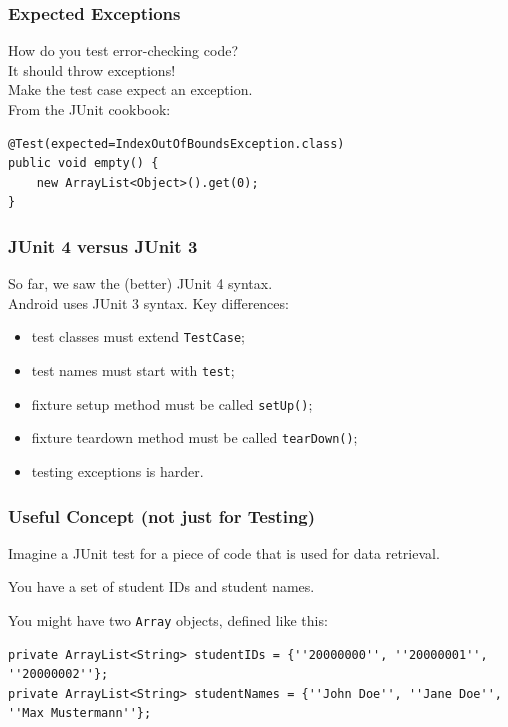 \begin{frame}[fragile]
\frametitle{Expected Exceptions}

\begin{changemargin}{1cm}
How do you test error-checking code?\\[1em]

\pause
It should throw exceptions!\\[1em]

Make the test case expect an exception.\\[1em]
From the JUnit cookbook:
\end{changemargin}

\begin{verbatim}
@Test(expected=IndexOutOfBoundsException.class) 
public void empty() { 
    new ArrayList<Object>().get(0); 
}
\end{verbatim}

\end{frame}

\begin{frame}
\frametitle{JUnit 4 versus JUnit 3}

\begin{changemargin}{1cm}
So far, we saw the (better) JUnit 4 syntax.\\[1em]

Android uses JUnit 3 syntax. Key differences:

\begin{itemize}
\item test classes must extend {\tt TestCase};
\item test names must start with {\tt test};
\item fixture setup method must be called {\tt setUp()};
\item fixture teardown method must be called {\tt tearDown()};
\item testing exceptions is harder.
\end{itemize}

\end{changemargin}
\end{frame}


\begin{frame}[fragile]
\frametitle{Useful Concept (not just for Testing)}

\begin{changemargin}{1cm}

Imagine a JUnit test for a piece of code that is used for data retrieval. 

You have a set of student IDs and student names. 

You might have two \texttt{Array} objects, defined like this:

{\tiny
\begin{verbatim}
private ArrayList<String> studentIDs = {''20000000'', ''20000001'', ''20000002''};
private ArrayList<String> studentNames = {''John Doe'', ''Jane Doe'', ''Max Mustermann''};
\end{verbatim}
}


\end{changemargin}
\end{frame}

